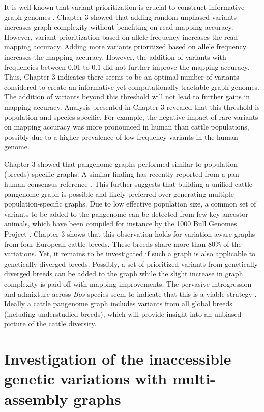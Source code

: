 \documentclass[../main.tex]{subfiles}
\begin{document}
It is well known that variant prioritization is crucial to construct informative graph genomes \citep{pritt2018forge,jain2021variant}. Chapter 3 showed that adding random unphased variants increases graph complexity without benefiting on read mapping accuracy. However, variant prioritization based on allele frequency increases the read mapping accuracy. Adding more variants prioritized based on allele frequency increases the mapping accuracy. However, the addition of variants with frequencies between 0.01 to 0.1 did not further improve the mapping accuracy. Thus, Chapter 3 indicates there seems to be an optimal number of variants considered to create an informative yet computationally tractable graph genomes. The addition of variants beyond this threshold will not lead to further gains in mapping accuracy. Analysis presented in Chapter 3 revealed that this threshold is population and species-specific. For example, the negative impact of rare variants on mapping accuracy was more pronounced in human than cattle populations, possibly due to a higher prevalence of low-frequency variants in the human genome. 

Chapter 3 showed that pangenome graphs performed similar to population (breeds) specific graphs. A similar finding has recently reported from a pan-human consensus reference \citep{kaminow2020virtue}. This further suggests that building a unified cattle pangenome graph is possible and likely preferred over generating multiple population-specific graphs. Due to low effective population size, a common set of variants to be added to the pangenome can be detected from few key ancestor animals, which have been compiled for instance by the 1000 Bull Genomes Project \citep{hayes20191000}.  Chapter 3 shows that this observation holds for variation-aware graphs from four European cattle breeds. These breeds share more than 80\% of the variations. Yet, it remains to be investigated  if such a graph is also applicable to genetically-diverged breeds. Possibly, a set of prioritized variants from genetically-diverged breeds can be added to the graph while the slight increase in graph complexity is paid off with mapping improvements. The pervasive introgression and admixture across \emph{Bos} species seem to indicate that this is a viable strategy \citep{wu2018pervasive}. Ideally a cattle pangenome graph includes variants from all global breeds (including understudied breeds), which will provide insight into an unbiased picture of the cattle diversity. 

\section{Investigation of the inaccessible genetic variations with multi-assembly graphs}
\end{document}
